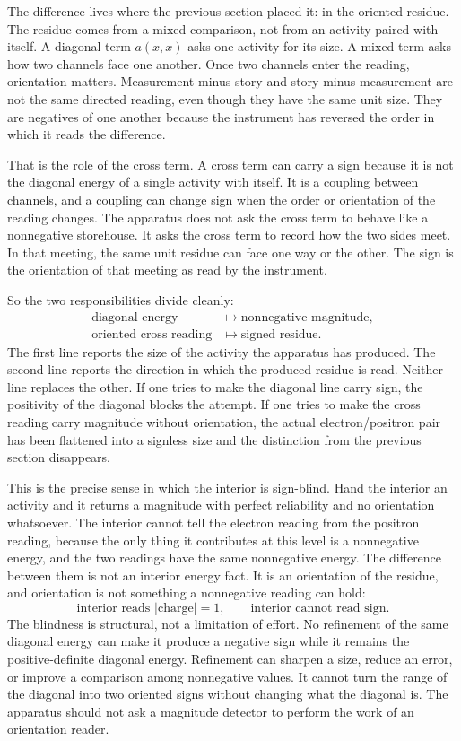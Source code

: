 The difference lives where the previous section placed it: in the oriented
residue. The residue comes from a mixed comparison, not from an activity paired
with itself. A diagonal term \(a(x,x)\) asks one activity for its size. A mixed
term asks how two channels face one another. Once two channels enter the reading,
orientation matters. Measurement-minus-story and story-minus-measurement are
not the same directed reading, even though they have the same unit size. They
are negatives of one another because the instrument has reversed the order in
which it reads the difference.

That is the role of the cross term. A cross term can carry a sign because it is
not the diagonal energy of a single activity with itself. It is a coupling
between channels, and a coupling can change sign when the order or orientation
of the reading changes. The apparatus does not ask the cross term to behave like
a nonnegative storehouse. It asks the cross term to record how the two sides
meet. In that meeting, the same unit residue can face one way or the other.
The sign is the orientation of that meeting as read by the instrument.

So the two responsibilities divide cleanly:
\[
  \begin{aligned}
    \text{diagonal energy} &\longmapsto \text{nonnegative magnitude},\\
    \text{oriented cross reading} &\longmapsto \text{signed residue}.
  \end{aligned}
\]
The first line reports the size of the activity the apparatus has produced. The
second line reports the direction in which the produced residue is read. Neither
line replaces the other. If one tries to make the diagonal line carry sign, the
positivity of the diagonal blocks the attempt. If one tries to make the cross
reading carry magnitude without orientation, the actual electron/positron pair
has been flattened into a signless size and the distinction from the previous
section disappears.

This is the precise sense in which the interior is sign-blind. Hand the
interior an activity and it returns a magnitude with perfect reliability and no
orientation whatsoever. The interior cannot tell the electron reading from the
positron reading, because the only thing it contributes at this level is a
nonnegative energy, and the two readings have the same nonnegative energy. The
difference between them is not an interior energy fact. It is an orientation of
the residue, and orientation is not something a nonnegative reading can hold:
\[
  \text{interior reads } |\text{charge}| = 1,
  \qquad
  \text{interior cannot read } \mathrm{sign}.
\]
The blindness is structural, not a limitation of effort. No refinement of the
same diagonal energy can make it produce a negative sign while it remains the
positive-definite diagonal energy. Refinement can sharpen a size, reduce an
error, or improve a comparison among nonnegative values. It cannot turn the
range of the diagonal into two oriented signs without changing what the diagonal
is. The apparatus should not ask a magnitude detector to perform the work of an
orientation reader.


